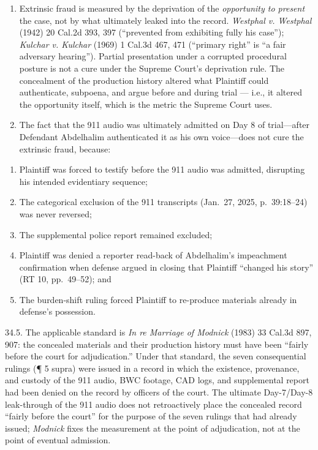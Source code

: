 \begin{enumerate}
\def\labelenumi{\arabic{enumi}.}
\setcounter{enumi}{32}
\item
  Extrinsic fraud is measured by the deprivation of the \emph{opportunity to present} the case, not by what ultimately leaked into the record. \emph{Westphal v. Westphal} (1942) 20 Cal.2d 393, 397 (``prevented from exhibiting fully his case''); \emph{Kulchar v. Kulchar} (1969) 1 Cal.3d 467, 471 (``primary right'' is ``a fair adversary hearing''). Partial presentation under a corrupted procedural posture is not a cure under the Supreme Court's deprivation rule. The concealment of the production history altered what Plaintiff could authenticate, subpoena, and argue before and during trial --- i.e., it altered the opportunity itself, which is the metric the Supreme Court uses.
\item
  The fact that the 911 audio was ultimately admitted on Day 8 of trial---after Defendant Abdelhalim authenticated it as his own voice---does not cure the extrinsic fraud, because:
\end{enumerate}

\begin{enumerate}
\def\labelenumi{(\alph{enumi})}
\item
  Plaintiff was forced to testify before the 911 audio was admitted, disrupting his intended evidentiary sequence;
\item
  The categorical exclusion of the 911 transcripts (Jan.~27, 2025, p.~39:18--24) was never reversed;
\item
  The supplemental police report remained excluded;
\item
  Plaintiff was denied a reporter read-back of Abdelhalim's impeachment confirmation when defense argued in closing that Plaintiff ``changed his story'' (RT 10, pp.~49--52); and
\item
  The burden-shift ruling forced Plaintiff to re-produce materials already in defense's possession.
\end{enumerate}

34.5. The applicable standard is \emph{In re Marriage of Modnick} (1983) 33 Cal.3d 897, 907: the concealed materials and their production history must have been ``fairly before the court for adjudication.'' Under that standard, the seven consequential rulings (¶ 5 supra) were issued in a record in which the existence, provenance, and custody of the 911 audio, BWC footage, CAD logs, and supplemental report had been denied on the record by officers of the court. The ultimate Day-7/Day-8 leak-through of the 911 audio does not retroactively place the concealed record ``fairly before the court'' for the purpose of the seven rulings that had already issued; \emph{Modnick} fixes the measurement at the point of adjudication, not at the point of eventual admission.

